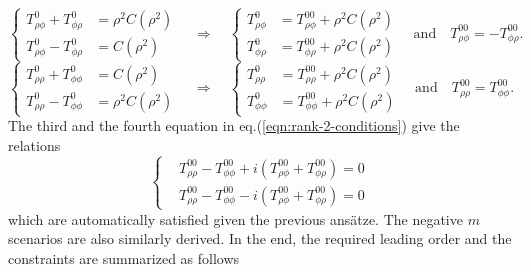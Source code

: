 \documentclass[a4paper, 11pt]{article}
\begin{document}
\[
\left\{\begin{aligned}
    T_{\rho\phi}^0 + T_{\phi\rho}^0 &= \rho^2 C(\rho^2) \\ 
    T_{\rho\phi}^0 - T_{\phi\rho}^0 &= C(\rho^2)
\end{aligned}\right. \quad \Longrightarrow\quad 
\left\{\begin{aligned}
    T_{\rho\phi}^0 &= T_{\rho\phi}^{00} + \rho^2 C(\rho^2) \\ 
    T_{\phi\rho}^0 &= T_{\phi\rho}^{00} + \rho^2 C(\rho^2) 
\end{aligned}\right. \quad \mathrm{and} \quad T_{\rho\phi}^{00} = -T_{\phi\rho}^{00}.
\]
\[
\left\{\begin{aligned}
    T_{\rho\rho}^0 + T_{\phi \phi}^0 &= C(\rho^2) \\ 
    T_{\rho\rho}^0 - T_{\phi \phi}^0 &= \rho^2 C(\rho^2)
\end{aligned}\right. \quad \Longrightarrow\quad 
\left\{\begin{aligned}
    T_{\rho\rho}^0 &= T_{\rho\rho}^{00} + \rho^2 C(\rho^2) \\ 
    T_{\phi \phi}^0 &= T_{\phi\phi}^{00} + \rho^{2} C(\rho^2) 
\end{aligned}\right. \quad \mathrm{and} \quad T_{\rho\rho}^{00} = T_{\phi\phi}^{00}.
\]
The third and the fourth equation in eq.(\ref{eqn:rank-2-conditions}) give the relations
\[
\left\{\begin{aligned}
    &T_{\rho\rho}^{00} - T_{\phi\phi}^{00} + i \left(T_{\rho\phi}^{00} + T_{\phi\rho}^{00}\right) = 0 \\ 
    &T_{\rho\rho}^{00} - T_{\phi\phi}^{00} - i \left(T_{\rho\phi}^{00} + T_{\phi\rho}^{00}\right) = 0
\end{aligned}\right.
\]
which are automatically satisfied given the previous ansätze. The negative $m$ scenarios are also similarly derived. In the end, the required leading order and the constraints are summarized as follows
\end{document}
